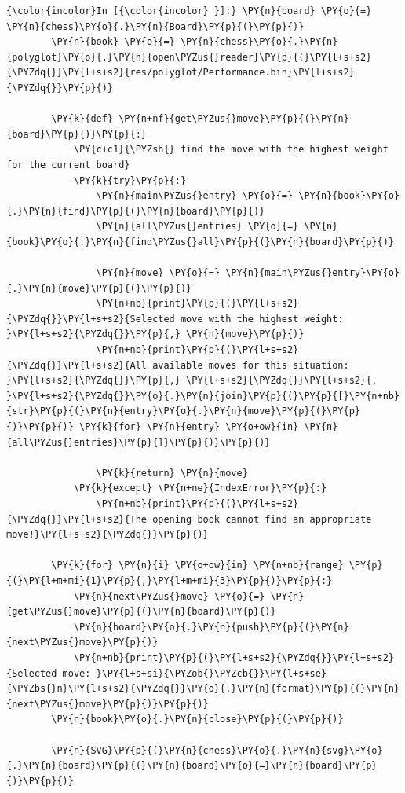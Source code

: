     \begin{Verbatim}[commandchars=\\\{\}]
{\color{incolor}In [{\color{incolor} }]:} \PY{n}{board} \PY{o}{=} \PY{n}{chess}\PY{o}{.}\PY{n}{Board}\PY{p}{(}\PY{p}{)}
        \PY{n}{book} \PY{o}{=} \PY{n}{chess}\PY{o}{.}\PY{n}{polyglot}\PY{o}{.}\PY{n}{open\PYZus{}reader}\PY{p}{(}\PY{l+s+s2}{\PYZdq{}}\PY{l+s+s2}{res/polyglot/Performance.bin}\PY{l+s+s2}{\PYZdq{}}\PY{p}{)}
        
        \PY{k}{def} \PY{n+nf}{get\PYZus{}move}\PY{p}{(}\PY{n}{board}\PY{p}{)}\PY{p}{:}
            \PY{c+c1}{\PYZsh{} find the move with the highest weight for the current board}
            \PY{k}{try}\PY{p}{:}
                \PY{n}{main\PYZus{}entry} \PY{o}{=} \PY{n}{book}\PY{o}{.}\PY{n}{find}\PY{p}{(}\PY{n}{board}\PY{p}{)}
                \PY{n}{all\PYZus{}entries} \PY{o}{=} \PY{n}{book}\PY{o}{.}\PY{n}{find\PYZus{}all}\PY{p}{(}\PY{n}{board}\PY{p}{)}
        
                \PY{n}{move} \PY{o}{=} \PY{n}{main\PYZus{}entry}\PY{o}{.}\PY{n}{move}\PY{p}{(}\PY{p}{)}
                \PY{n+nb}{print}\PY{p}{(}\PY{l+s+s2}{\PYZdq{}}\PY{l+s+s2}{Selected move with the highest weight: }\PY{l+s+s2}{\PYZdq{}}\PY{p}{,} \PY{n}{move}\PY{p}{)}
                \PY{n+nb}{print}\PY{p}{(}\PY{l+s+s2}{\PYZdq{}}\PY{l+s+s2}{All available moves for this situation: }\PY{l+s+s2}{\PYZdq{}}\PY{p}{,} \PY{l+s+s2}{\PYZdq{}}\PY{l+s+s2}{, }\PY{l+s+s2}{\PYZdq{}}\PY{o}{.}\PY{n}{join}\PY{p}{(}\PY{p}{[}\PY{n+nb}{str}\PY{p}{(}\PY{n}{entry}\PY{o}{.}\PY{n}{move}\PY{p}{(}\PY{p}{)}\PY{p}{)} \PY{k}{for} \PY{n}{entry} \PY{o+ow}{in} \PY{n}{all\PYZus{}entries}\PY{p}{]}\PY{p}{)}\PY{p}{)}
        
                \PY{k}{return} \PY{n}{move}
            \PY{k}{except} \PY{n+ne}{IndexError}\PY{p}{:}
                \PY{n+nb}{print}\PY{p}{(}\PY{l+s+s2}{\PYZdq{}}\PY{l+s+s2}{The opening book cannot find an appropriate move!}\PY{l+s+s2}{\PYZdq{}}\PY{p}{)}
        
        \PY{k}{for} \PY{n}{i} \PY{o+ow}{in} \PY{n+nb}{range} \PY{p}{(}\PY{l+m+mi}{1}\PY{p}{,}\PY{l+m+mi}{3}\PY{p}{)}\PY{p}{:}
            \PY{n}{next\PYZus{}move} \PY{o}{=} \PY{n}{get\PYZus{}move}\PY{p}{(}\PY{n}{board}\PY{p}{)}
            \PY{n}{board}\PY{o}{.}\PY{n}{push}\PY{p}{(}\PY{n}{next\PYZus{}move}\PY{p}{)}
            \PY{n+nb}{print}\PY{p}{(}\PY{l+s+s2}{\PYZdq{}}\PY{l+s+s2}{Selected move: }\PY{l+s+si}{\PYZob{}\PYZcb{}}\PY{l+s+se}{\PYZbs{}n}\PY{l+s+s2}{\PYZdq{}}\PY{o}{.}\PY{n}{format}\PY{p}{(}\PY{n}{next\PYZus{}move}\PY{p}{)}\PY{p}{)}
        \PY{n}{book}\PY{o}{.}\PY{n}{close}\PY{p}{(}\PY{p}{)}
        
        \PY{n}{SVG}\PY{p}{(}\PY{n}{chess}\PY{o}{.}\PY{n}{svg}\PY{o}{.}\PY{n}{board}\PY{p}{(}\PY{n}{board}\PY{o}{=}\PY{n}{board}\PY{p}{)}\PY{p}{)}
\end{Verbatim}


